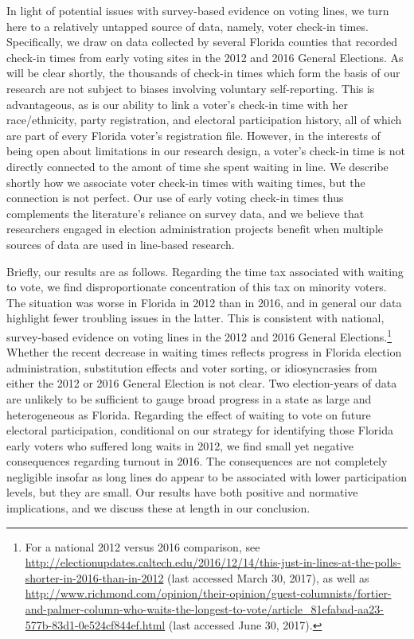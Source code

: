 \documentclass[12pt,titlepage]{article}
\begin{document}
In light of potential issues with survey-based evidence on voting
lines, we turn here to a relatively untapped source of data, namely,
voter check-in times. Specifically, we draw on data collected by
several Florida counties that recorded check-in times from early
voting sites in the 2012 and 2016 General Elections.  As will be clear
shortly, the thousands of check-in times which form the basis of our
research are not subject to biases involving voluntary self-reporting.
This is advantageous, as is our ability to link a voter's check-in
time with her race/ethnicity, party registration, and electoral
participation history, all of which are part of every Florida voter's
registration file.  However, in the interests of being open about
limitations in our research design, a voter's check-in time is not
directly connected to the amont of time she spent waiting in line.  We
describe shortly how we associate voter check-in times with waiting
times, but the connection is not perfect.  Our use of early voting
check-in times thus complements the literature's reliance on survey
data, and we believe that researchers engaged in election
administration projects benefit when multiple sources of data are used
in line-based research.

Briefly, our results are as follows.  Regarding the time tax
associated with waiting to vote, we find disproportionate
concentration of this tax on minority voters.  The situation was worse
in Florida in 2012 than in 2016, and in general our data highlight
fewer troubling issues in the latter.  This is consistent with
national, survey-based evidence on voting lines in the 2012 and 2016
General Elections.\footnote{For a national 2012 versus 2016
  comparison, see
  \url{http://electionupdates.caltech.edu/2016/12/14/this-just-in-lines-at-the-polls-shorter-in-2016-than-in-2012}
  (last accessed March 30, 2017), as well as
  \url{http://www.richmond.com/opinion/their-opinion/guest-columnists/fortier-and-palmer-column-who-waits-the-longest-to-vote/article_81efabad-aa23-577b-83d1-0e524cf844ef.html}
  (last accessed June 30, 2017).}  Whether the recent decrease in
waiting times reflects progress in Florida election administration,
substitution effects and voter sorting, or idiosyncrasies from either
the 2012 or 2016 General Election is not clear.  Two election-years of
data are unlikely to be sufficient to gauge broad progress in a state
as large and heterogeneous as Florida.  Regarding the effect of
waiting to vote on future electoral participation, conditional on our
strategy for identifying those Florida early voters who suffered long
waits in 2012, we find small yet negative consequences regarding
turnout in 2016. The consequences are not completely negligible
insofar as long lines do appear to be associated with lower
participation levels, but they are small.  Our results have both
positive and normative implications, and we discuss these at length in
our conclusion.
\end{document}
